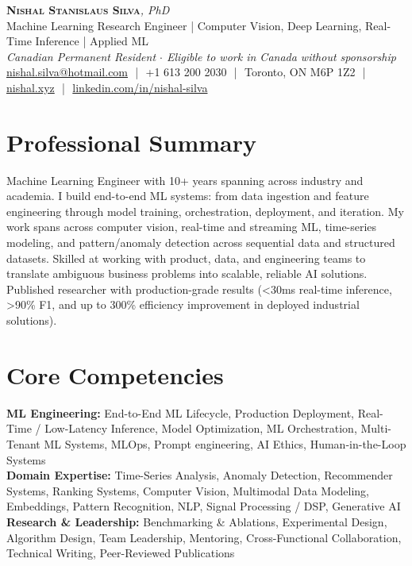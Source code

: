 \documentclass[11pt]{article}
\begin{document}
\pagestyle{empty}
\begin{center}
    {\LARGE \scshape \textbf{Nishal Stanislaus Silva}}{\large \textit{, PhD}}
    \\[1pt]
    {\small Machine Learning Research Engineer | Computer Vision, Deep Learning, Real-Time Inference | Applied ML}
    \\[1pt]
    {\footnotesize\textit{Canadian Permanent Resident $\cdot$ Eligible to work in Canada without sponsorship}}
    \\[1pt]
    {\small \href{mailto:nishal.silva@hotmail.com}{nishal.silva@hotmail.com}
    \,\,|\,\, +1 613 200 2030
    \,\,|\,\, Toronto, ON M6P 1Z2
    \,\,|\,\, \href{https://nishal.xyz}{nishal.xyz}
    \,\,|\,\, \href{https://www.linkedin.com/in/nishal-silva}{linkedin.com/in/nishal-silva}}
\end{center}

\section*{Professional Summary}
Machine Learning Engineer with 10+ years spanning across industry and academia. I build end-to-end ML systems: from data ingestion and feature engineering through model training, orchestration, deployment, and iteration. My work spans across computer vision, real-time and streaming ML, time-series modeling, and pattern/anomaly detection across sequential data and structured datasets. Skilled at working with product, data, and engineering teams to translate ambiguous business problems into scalable, reliable AI solutions. Published researcher with production-grade results (<30ms real-time inference, >90\% F1, and up to 300\% efficiency improvement in deployed industrial solutions).

\section*{Core Competencies}
\textbf{ML Engineering:} End-to-End ML Lifecycle, Production Deployment, Real-Time / Low-Latency Inference, Model Optimization, ML Orchestration, Multi-Tenant ML Systems, MLOps, Prompt engineering, AI Ethics, Human-in-the-Loop Systems\\
\textbf{Domain Expertise:} Time-Series Analysis, Anomaly Detection, Recommender Systems, Ranking Systems, Computer Vision, Multimodal Data Modeling, Embeddings, Pattern Recognition, NLP, Signal Processing / DSP, Generative AI\\
\textbf{Research \& Leadership:} Benchmarking \& Ablations, Experimental Design, Algorithm Design, Team Leadership, Mentoring, Cross-Functional Collaboration, Technical Writing, Peer-Reviewed Publications
\end{document}
